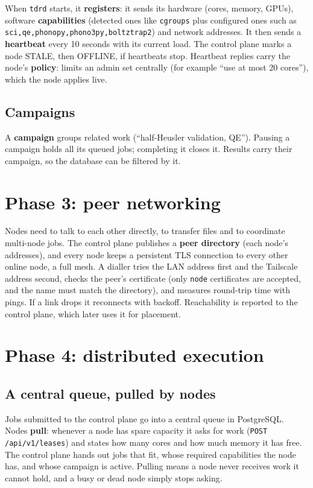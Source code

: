 \documentclass[11pt,a4paper]{report}
\newcommand{\code}[1]{\texttt{#1}}
\begin{document}
When \code{tdrd} starts, it \textbf{registers}: it sends its hardware (cores, memory, GPUs),
software \textbf{capabilities} (detected ones like \code{cgroups} plus configured ones such as
\code{sci,qe,phonopy,phono3py,boltztrap2}) and network addresses. It then sends a
\textbf{heartbeat} every 10 seconds with its current load. The control plane marks a node STALE,
then OFFLINE, if heartbeats stop. Heartbeat replies carry the node's \textbf{policy}: limits an
admin set centrally (for example ``use at most 20 cores''), which the node applies live.

\section{Campaigns}

A \textbf{campaign} groups related work (``half-Heusler validation, QE''). Pausing a campaign
holds all its queued jobs; completing it closes it. Results carry their campaign, so the
database can be filtered by it.

\chapter{Phase 3: peer networking}

Nodes need to talk to each other directly, to transfer files and to coordinate multi-node jobs.
The control plane publishes a \textbf{peer directory} (each node's addresses), and every node keeps
a persistent TLS connection to every other online node, a full mesh. A dialler tries the LAN
address first and the Tailscale address second, checks the peer's certificate (only
\code{node} certificates are accepted, and the name must match the directory), and measures
round-trip time with pings. If a link drops it reconnects with backoff. Reachability is reported
to the control plane, which later uses it for placement.

\chapter{Phase 4: distributed execution}

\section{A central queue, pulled by nodes}

Jobs submitted to the control plane go into a central queue in PostgreSQL. Nodes \textbf{pull}:
whenever a node has spare capacity it asks for work (\code{POST /api/v1/leases}) and states how
many cores and how much memory it has free. The control plane hands out jobs that fit, whose
required capabilities the node has, and whose campaign is active. Pulling means a node never
receives work it cannot hold, and a busy or dead node simply stops asking.
\end{document}
